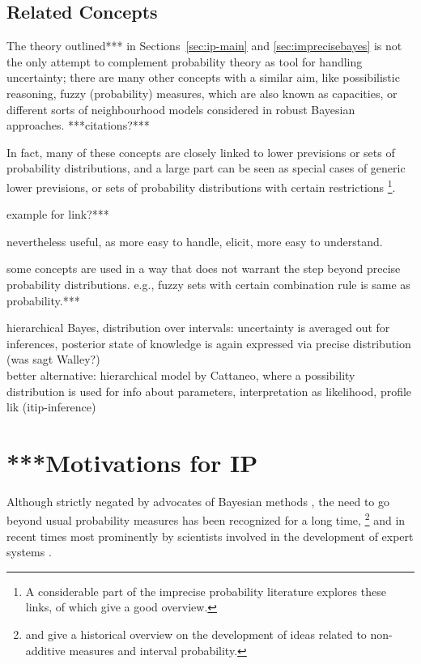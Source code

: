 \subsection{Related Concepts}

The theory outlined*** in Sections~\ref{sec:ip-main} and \ref{sec:imprecisebayes}
is not the only attempt to complement probability theory as tool for handling uncertainty;
there are many other concepts with a similar aim,
like possibilistic reasoning, fuzzy (probability) measures, which are also known as capacities,
or different sorts of neighbourhood models considered in robust Bayesian approaches. ***citations?*** %

In fact, many of these concepts are closely linked to
lower previsions or sets of probability distributions,
and a large part can be seen as special cases of generic lower previsions, 
or sets of probability distributions with certain restrictions%
\footnote{A considerable part of the imprecise probability literature
explores these links, of which \textcite{itip-special,itip-other}
give a good overview.}. %

example for link?***

nevertheless useful, as more easy to handle, elicit,
more easy to understand.

some concepts are used in a way that does not warrant
the step beyond precise probability distributions.
e.g., fuzzy sets with certain combination rule is same as probability.***

hierarchical Bayes, distribution over intervals:
uncertainty is averaged out for inferences,
posterior state of knowledge is again expressed via precise distribution (was sagt Walley?)\\
better alternative: hierarchical model by Cattaneo,
where a possibility distribution is used for info about parameters,
interpretation as likelihood, profile lik (itip-inference)



\section{***Motivations for IP}
\label{sec:motivation}

Although strictly negated by advocates of Bayesian methods \parencite[e.g., by][]{1987:lindley},
the need to go beyond usual probability measures has been recognized for a long time,%
\footnote{\textcite{2009:hampel} and \textcite[\S 1]{2001:weichselberger} give a historical overview on the development of
ideas related to non-additive measures and interval probability.}
and in recent times most prominently by scientists involved in the development of expert systems \parencite{1996:walley::expert}.

